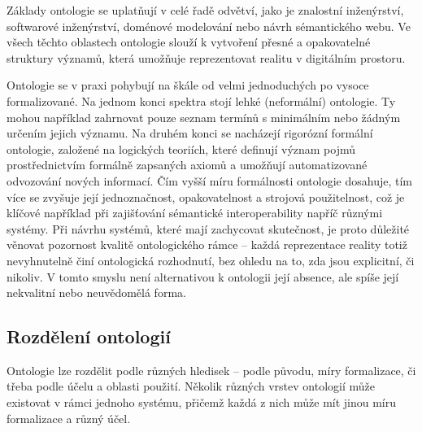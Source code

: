 Základy ontologie se uplatňují v celé řadě odvětví, jako je znalostní inženýrství, softwarové inženýrství, doménové modelování nebo návrh sémantického webu. Ve všech těchto oblastech ontologie slouží k vytvoření přesné a opakovatelné struktury významů, která umožňuje reprezentovat realitu v digitálním prostoru. \cite{Guizzardi2005}

Ontologie se v praxi pohybují na škále od velmi jednoduchých po vysoce formalizované. Na jednom konci spektra stojí lehké (neformální) ontologie. Ty mohou například zahrnovat pouze seznam termínů s minimálním nebo žádným určením jejich významu. Na druhém konci se nacházejí rigorózní formální ontologie, založené na logických teoriích, které definují význam pojmů prostřednictvím formálně zapsaných axiomů a umožňují automatizované odvozování nových informací. Čím vyšší míru formálnosti ontologie dosahuje, tím více se zvyšuje její jednoznačnost, opakovatelnost a strojová použitelnost, což je klíčové například při zajišťování sémantické interoperability napříč různými systémy. \cite{Uschold2004} Při návrhu systémů, které mají zachycovat skutečnost, je proto důležité věnovat pozornost kvalitě ontologického rámce – každá reprezentace reality totiž nevyhnutelně činí ontologická rozhodnutí, bez ohledu na to, zda jsou explicitní, či nikoliv. V tomto smyslu není alternativou k ontologii její absence, ale spíše její nekvalitní nebo neuvědomělá forma. \cite{Pergl2018, Guizzardi2008}


\subsection{Rozdělení ontologií}
\label{sec:rozdělení-ontologií}
Ontologie lze rozdělit podle různých hledisek – podle původu, míry formalizace, či třeba podle účelu a oblasti použití. Několik různých vrstev ontologií může existovat v rámci jednoho systému, přičemž každá z nich může mít jinou míru formalizace a různý účel. \cite{Guarino2009}


